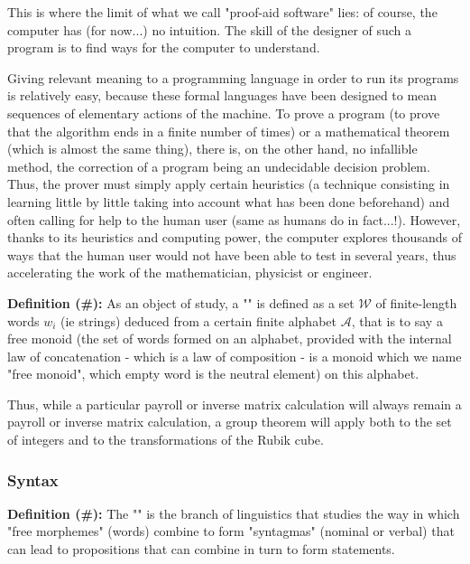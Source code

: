 	This is where the limit of what we call "proof-aid software" lies: of course, the computer has (for now...) no intuition. The skill of the designer of such a program is to find ways for the computer to understand.

	Giving relevant meaning to a programming language in order to run its programs is relatively easy, because these formal languages have been designed to mean sequences of elementary actions of the machine. To prove a program (to prove that the algorithm ends in a finite number of times) or a mathematical theorem (which is almost the same thing), there is, on the other hand, no infallible method, the correction of a program being an undecidable decision problem. Thus, the prover must simply apply certain heuristics (a technique consisting in learning little by little taking into account what has been done beforehand) and often calling for help to the human user (same as humans do in fact...!). However, thanks to its heuristics and computing power, the computer explores thousands of ways that the human user would not have been able to test in several years, thus accelerating the work of the mathematician, physicist or engineer.
	
	\textbf{Definition (\#\mydef):} As an object of study, a "" is defined as a set $\mathcal{W}$ of finite-length words $w_i$ (ie strings) deduced from a certain finite alphabet $\mathcal{A}$, that is to say a free monoid (the set of words formed on an alphabet, provided with the internal law of concatenation - which is a law of composition - is a monoid which we name "free monoid", which empty word is the neutral element) on this alphabet.
	
	\begin{tcolorbox}[title=Remark,colframe=black,arc=10pt]
	Thus, while a particular payroll or inverse matrix calculation will always remain a payroll or inverse matrix calculation, a group theorem will apply both to the set of integers and to the transformations of the Rubik cube.
	\end{tcolorbox}
	
	\subsubsection{Syntax}
	\textbf{Definition (\#\mydef):} The "" is the branch of linguistics that studies the way in which "free morphemes" (words) combine to form "syntagmas" (nominal or verbal) that can lead to propositions that can combine in turn to form statements.
	
